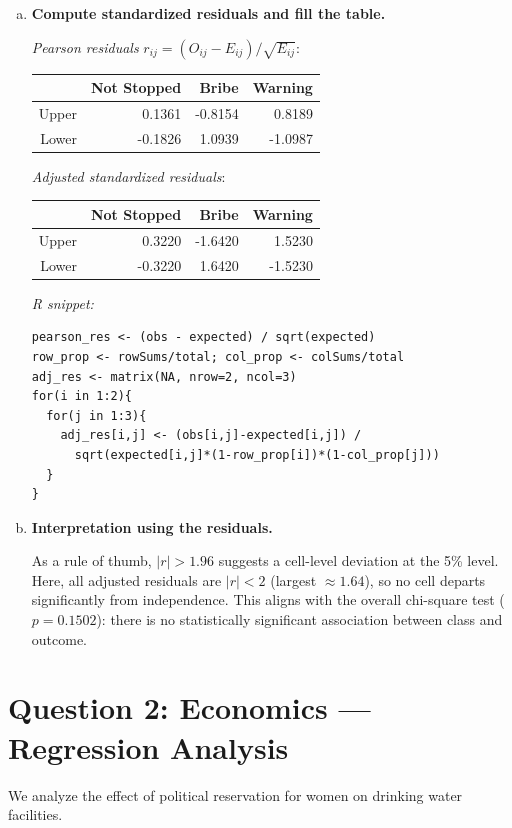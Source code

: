 \documentclass[12pt,letterpaper]{article}
\begin{document}
\begin{enumerate}[(a)]
\item \textbf{Compute standardized residuals and fill the table.}

\textit{Pearson residuals} $r_{ij}=(O_{ij}-E_{ij})/\sqrt{E_{ij}}$:
\begin{center}
\begin{tabular}{r|rrr}\hline
 & Not Stopped & Bribe & Warning\\ \hline
Upper & 0.1361 & -0.8154 & 0.8189\\
Lower & -0.1826 & 1.0939 & -1.0987\\ \hline
\end{tabular}
\end{center}

\textit{Adjusted standardized residuals}:
\begin{center}
\begin{tabular}{r|rrr}\hline
 & Not Stopped & Bribe & Warning\\ \hline
Upper & 0.3220 & -1.6420 & 1.5230\\
Lower & -0.3220 & 1.6420 & -1.5230\\ \hline
\end{tabular}
\end{center}

\textit{R snippet:}
\begin{lstlisting}[caption={Q1(c) residuals in R}]
pearson_res <- (obs - expected) / sqrt(expected)
row_prop <- rowSums/total; col_prop <- colSums/total
adj_res <- matrix(NA, nrow=2, ncol=3)
for(i in 1:2){
  for(j in 1:3){
    adj_res[i,j] <- (obs[i,j]-expected[i,j]) /
      sqrt(expected[i,j]*(1-row_prop[i])*(1-col_prop[j]))
  }
}
\end{lstlisting}

\item \textbf{Interpretation using the residuals.}

As a rule of thumb, $|r|>1.96$ suggests a cell-level deviation at the 5\% level.  
Here, all adjusted residuals are $|r|<2$ (largest $\approx1.64$), so no cell departs significantly from independence.  
This aligns with the overall chi-square test ($p=0.1502$): there is no statistically significant association between class and outcome.
\end{enumerate}

\vspace{0.6cm}
\section*{Question 2: Economics --- Regression Analysis}
We analyze the effect of political reservation for women on drinking water facilities.
\end{document}
